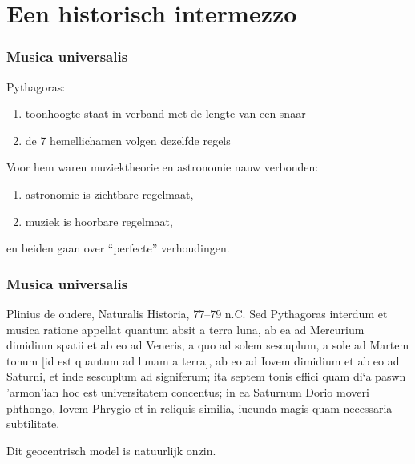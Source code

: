 \documentclass[compress, darktitle, framenumber, totalframenumber]{beamer}
\begin{document}
\section{Een historisch intermezzo}

\begin{frame}
  \frametitle{Musica universalis}

  Pythagoras:
  \begin{enumerate}
    \item toonhoogte staat in verband met de lengte van een snaar
    \item de 7 hemellichamen volgen dezelfde regels
  \end{enumerate}

  \pause
  Voor hem waren muziektheorie en astronomie nauw verbonden:
  \begin{enumerate}
    \item astronomie is \alert{zichtbare} regelmaat,
    \item muziek is \alert{hoorbare} regelmaat,
  \end{enumerate}
  en beiden gaan over \alert{``perfecte'' verhoudingen}.
\end{frame}

\begin{frame}
  \frametitle{Musica universalis}

  \begin{block}{Plinius de oudere, Naturalis Historia, 77--79 n.C.}
    Sed Pythagoras interdum et musica ratione appellat quantum absit a terra luna, ab ea ad Mercurium dimidium spatii et ab eo ad Veneris, a quo ad solem sescuplum, a sole ad Martem tonum [id est quantum ad lunam a terra], ab eo ad Iovem dimidium et ab eo ad Saturni, et inde sescuplum ad signiferum; ita septem tonis effici quam \greektext di`a paswn 'armon'ian \latintext hoc est universitatem concentus; in ea Saturnum Dorio moveri phthongo, Iovem Phrygio et in reliquis similia, iucunda magis quam necessaria subtilitate.
  \end{block}

  \pause

  Dit \alert{geocentrisch model} is natuurlijk onzin.
\end{frame}
\end{document}
